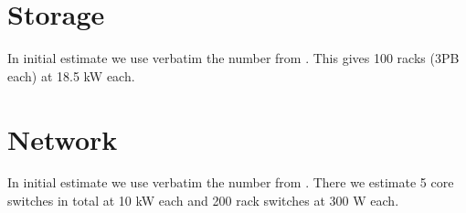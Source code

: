 \documentclass[useAMS,usenatbib,referee]{article}
\begin{document}
\section{Storage}

In initial estimate we use verbatim the number from
\cite{SDP-PROP-DR-001-1-ElemConc}. This gives 100 racks (3PB each) at
18.5 kW each.

\section{Network}

In initial estimate we use verbatim the number from
\cite{SDP-PROP-DR-001-1-ElemConc}. There we estimate 5 core switches
in total at  10 kW each and 200 rack switches at 300 W each. 


 

\end{document}
